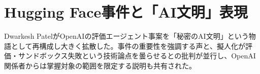 \section{Hugging Face事件と「AI文明」表現}
Dwarkesh PatelがOpenAIの評価エージェント事案を「秘密のAI文明」という物語として再構成し大きく拡散した。事件の重要性を強調する声と、擬人化が評価・サンドボックス失敗という技術論点を曇らせるとの批判が並行し、OpenAI関係者からは掌握対象の範囲を限定する説明も共有された。
